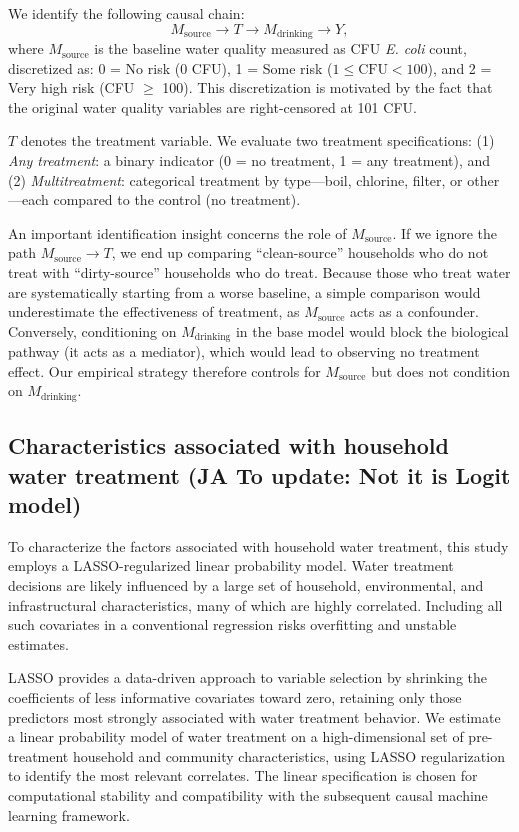 \documentclass [11pt]{article}
\theoremstyle{plain}
\theoremstyle{definition}
\theoremstyle{remark}
\newcommand{\1}{\bm{1}}
\begin{document}
We identify the following causal chain:
\begin{equation}
M_{\text{source}} \to T \to M_{\text{drinking}} \to Y,
\end{equation}
where $M_{\text{source}}$ is the baseline water quality measured as CFU \textit{E. coli} count, discretized as: 0 = No risk (0 CFU), 1 = Some risk ($1 \leq \text{CFU} < 100$), and 2 = Very high risk (CFU $\geq$ 100). This discretization is motivated by the fact that the original water quality variables are right-censored at 101 CFU.

$T$ denotes the treatment variable. We evaluate two treatment specifications: (1) \textit{Any treatment}: a binary indicator (0 = no treatment, 1 = any treatment), and (2) \textit{Multitreatment}: categorical treatment by type---boil, chlorine, filter, or other---each compared to the control (no treatment).

An important identification insight concerns the role of $M_{\text{source}}$. If we ignore the path $M_{\text{source}} \to T$, we end up comparing ``clean-source'' households who do not treat with ``dirty-source'' households who do treat. Because those who treat water are systematically starting from a worse baseline, a simple comparison would underestimate the effectiveness of treatment, as $M_{\text{source}}$ acts as a confounder. Conversely, conditioning on $M_{\text{drinking}}$ in the base model would block the biological pathway (it acts as a mediator), which would lead to observing no treatment effect. Our empirical strategy therefore controls for $M_{\text{source}}$ but does not condition on $M_{\text{drinking}}$.







\subsection{Characteristics associated with household water treatment (JA To update: Not it is Logit model)}
To characterize the factors associated with household water treatment, this study employs a LASSO-regularized linear probability model. Water treatment decisions are likely influenced by a large set of household, environmental, and infrastructural characteristics, many of which are highly correlated. Including all such covariates in a conventional regression risks overfitting and unstable estimates.

LASSO provides a data-driven approach to variable selection by shrinking the coefficients of less informative covariates toward zero, retaining only those predictors most strongly associated with water treatment behavior. We estimate a linear probability model of water treatment on a high-dimensional set of pre-treatment household and community characteristics, using LASSO regularization to identify the most relevant correlates. The linear specification is chosen for computational stability and compatibility with the subsequent causal machine learning framework.
\end{document}
